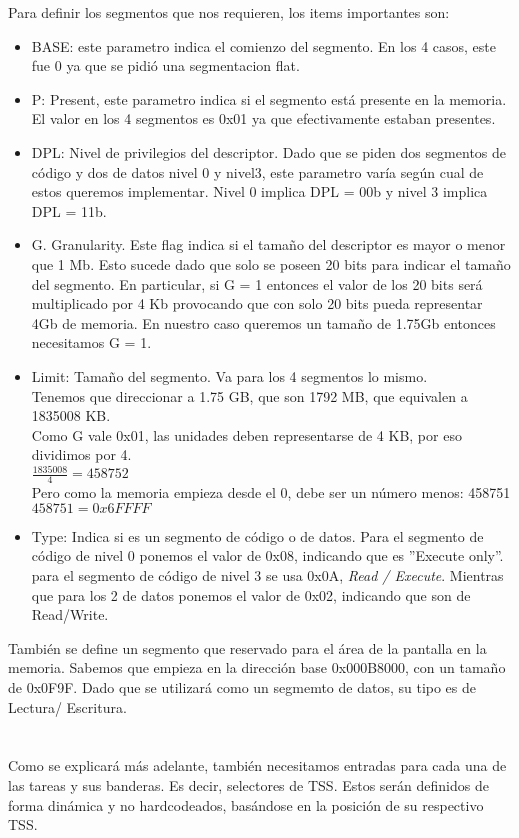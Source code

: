 Para definir los segmentos que nos requieren, los items importantes son:\\
\begin{itemize}
 \item BASE: este parametro indica el comienzo del segmento. En los 4 casos, este fue 0 ya que se pidió una segmentacion flat.
 \item P: Present, este parametro indica si el segmento est\'a presente en la memoria. El valor en los 4 segmentos es 0x01 ya que efectivamente estaban presentes.
 \item DPL: Nivel de privilegios del descriptor. Dado que se piden dos segmentos de código y dos de datos nivel 0 y nivel3, este 
parametro var\'ia seg\'un cual de estos queremos implementar. Nivel 0 implica DPL = 00b y nivel 3 implica DPL = 11b.
 \item G. Granularity. Este flag indica si el tamaño del descriptor es mayor o menor que 1 Mb. Esto sucede dado que solo se poseen 20 bits para 
indicar el tamaño del segmento. En particular, si G = 1 entonces el valor de los 20 bits ser\'a multiplicado por 4 Kb provocando que con 
 solo 20 bits pueda representar 4Gb de memoria. En nuestro caso queremos un tamaño de 1.75Gb entonces necesitamos G = 1.
 \item Limit: Tamaño del segmento. Va para los 4 segmentos lo mismo.\\
  \indent Tenemos que direccionar a 1.75 GB, que son 1792 MB, que equivalen a 1835008 KB.\\
  \indent Como G vale 0x01, las unidades deben representarse de 4 KB, por eso dividimos por 4.\\
  \indent $\frac{1835008}{4} = 458752$\\
  \indent Pero como la memoria empieza desde el 0, debe ser un n\'umero menos: 458751\\
  \indent $458751 = 0x6FFFF$
 \item Type: Indica si es un segmento de c\'odigo o de datos. Para el segmento de c\'odigo de nivel 0 ponemos el valor de 0x08, indicando 
que es ''Execute only''. para el segmento de c\'odigo de nivel 3 se usa 0x0A, \emph{Read / Execute}. Mientras que para los 2 de datos 
ponemos el valor de 0x02, indicando que son de Read/Write.
\end{itemize}

Tambi\'en se define un segmento que reservado para el \'area de la pantalla en la memoria. Sabemos que empieza en la direcci\'on base
0x000B8000, con un tamaño de 0x0F9F. Dado que se utilizar\'a como un segmemto de datos, su tipo es de Lectura/ Escritura.\\\\
\\
Como se explicar\'a m\'as adelante, tambi\'en necesitamos entradas para cada una de las tareas y sus banderas. Es decir, selectores de TSS. Estos ser\'an definidos de forma din\'amica y no hardcodeados, bas\'andose en la posici\'on de su respectivo TSS.



